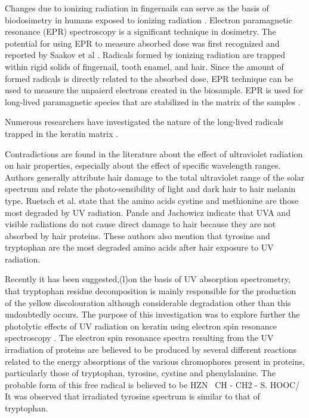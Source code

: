 \documentclass[]{interact}
\theoremstyle{plain}%
\theoremstyle{definition}
\theoremstyle{remark}
\begin{document}
Changes due to ionizing radiation in fingernails can serve as the basis of biodosimetry in humans exposed to ionizing radiation \cite{EPRofNail, KeratinStructure, Trompier2014}. Electron paramagnetic resonance (EPR) spectroscopy is a significant technique in dosimetry. The potential for using EPR to measure absorbed dose was first recognized and reported by Saakov et al \cite{EPR}. Radicals formed by ionizing radiation are trapped within rigid solids of fingernail, tooth enamel, and hair. Since the amount of formed radicals is directly related to the absorbed dose, EPR technique can be used to measure the unpaierd electrons created in the biosample. EPR is used for long-lived paramagnetic species that are stabilized in the matrix of the samples \cite{Symon1982, EPRbiodosimetry}.


Numerous researchers have investigated the nature of the long-lived radicals trapped in the keratin matrix \cite{Pailthorpe1972ESRACIDS, 1987-SulphurA-keratins, EPRofNail, Black2010ExRadicals, Trompier2014, Tipikin2016PossibleCalculations}. 


Contradictions are found in the literature about the effect of ultraviolet radiation on hair properties, especially about the effect of specific wavelength ranges. Authors generally attribute hair damage to the total ultraviolet range of the solar spectrum and relate the photo-sensibility of light and dark hair to hair melanin type. Ruetsch
et al. \cite{Ruetsch2000} state that the amino acids cystine and methionine are those most degraded by UV radiation. 
Pande and Jachowicz\cite{Pande1993} indicate that UVA and visible radiations do not cause direct damage to hair because they are not absorbed by hair proteins. These authors also mention that tyrosine and tryptophan are the most degraded amino acids after hair exposure to UV radiation.


Recently it has been suggested,(l)on the basis of UV absorption spectrometry, that tryptophan residue decomposition is mainly responsible for the production of the yellow discolouration although considerable degradation other than this undoubtedly occurs. The purpose of this investigation was to explore further the photolytic effects of UV radiation on keratin using electron spin resonance spectroscopy \cite{Dunlop1965}. The electron spin resonance spectra resulting from the UV irradiation of proteins are
believed to be produced by several different reactions related to the energy absorptions
of the various chromophores present in proteins, particularly those of tryptophan, tyrosine, cystine and phenylalanine. The probable form of this free radical is believed to be
HZN \
CH - CH2 - S.
HOOC/
It was observed that irradiated tyrosine spectrum is similar to that of tryptophan. 
\end{document}
